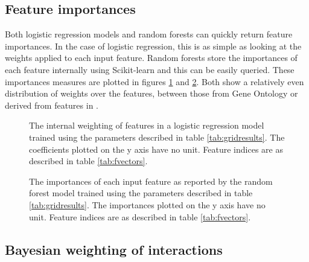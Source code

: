 \subsection{Feature importances}
\label{importances}

Both logistic regression models and random forests can quickly return feature importances.
In the case of logistic regression, this is as simple as looking at the weights applied to each input feature.
Random forests store the importances of each feature internally using Scikit-learn and this can be easily queried.
These importances measures are plotted in figures \ref{fig:logregweights} and \ref{fig:rfimportances}.
Both show a relatively even distribution of weights over the features, between those from Gene Ontology or derived from features in \textcite{rodgers-melnick_predicting_2013}.

\begin{figure}
    \centering
    \setlength\figureheight{2in}
    \setlength\figurewidth{3in}
    \caption{The internal weighting of features in a logistic regression model trained using the parameters described in table \ref{tab:gridresults}. The coefficients plotted on the y axis have no unit. Feature indices are as described in table \ref{tab:fvectors}.}
    \label{fig:logregweights}
\end{figure}

\begin{figure}
    \centering
    \setlength\figureheight{2in}
    \setlength\figurewidth{3in}
    \caption{The importances of each input feature as reported by the random forest model trained using the parameters described in table \ref{tab:gridresults}. The importances plotted on the y axis have no unit. Feature indices are as described in table \ref{tab:fvectors}.}
    \label{fig:rfimportances}
\end{figure}

\subsection{Bayesian weighting of interactions}
\label{bayesresults}

